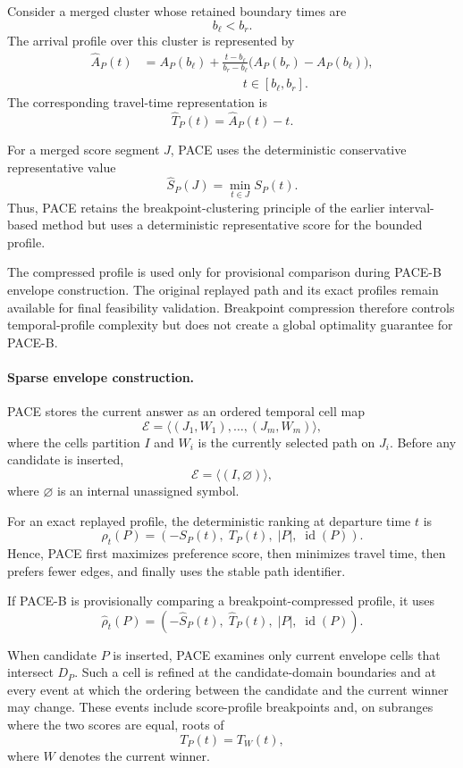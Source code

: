 \documentclass[a4paper,fleqn]{cas-dc}
\begin{document}
Consider a merged cluster whose retained boundary times are
\[
b_\ell<b_r.
\]
The arrival profile over this cluster is represented by
\[
\begin{aligned}
\widehat A_P(t)
&=A_P(b_\ell)
+\frac{t-b_\ell}{b_r-b_\ell}
\bigl(A_P(b_r)-A_P(b_\ell)\bigr),\\[-0.2ex]
&\hspace{8em} t\in[b_\ell,b_r].
\end{aligned}
\]
The corresponding travel-time representation is
\[
\widehat T_P(t)
=
\widehat A_P(t)-t.
\]

For a merged score segment \(J\), PACE uses the deterministic conservative
representative value
\[
\widehat S_P(J)
=
\min_{t\in J}S_P(t).
\]
Thus, PACE retains the breakpoint-clustering principle of the earlier
interval-based method but uses a deterministic representative score for the
bounded profile.

The compressed profile is used only for provisional comparison during
PACE-B envelope construction. The original replayed path and its exact
profiles remain available for final feasibility validation. Breakpoint
compression therefore controls temporal-profile complexity but does not create
a global optimality guarantee for PACE-B.

\paragraph{Sparse envelope construction.}
PACE stores the current answer as an ordered temporal cell map
\[
\mathcal E
=
\langle
(J_1,W_1),\ldots,(J_m,W_m)
\rangle,
\]
where the cells partition \(I\) and \(W_i\) is the currently selected path on
\(J_i\). Before any candidate is inserted,
\[
\mathcal E
=
\langle
(I,\varnothing)
\rangle,
\]
where \(\varnothing\) is an internal unassigned symbol.

For an exact replayed profile, the deterministic ranking at departure time
\(t\) is
\[
\rho_t(P)
=
\left(
-S_P(t),\;
T_P(t),\;
|P|,\;
\operatorname{id}(P)
\right).
\]
Hence, PACE first maximizes preference score, then minimizes travel time, then
prefers fewer edges, and finally uses the stable path identifier.

If PACE-B is provisionally comparing a breakpoint-compressed profile, it uses
\[
\widehat\rho_t(P)
=
\left(
-\widehat S_P(t),\;
\widehat T_P(t),\;
|P|,\;
\operatorname{id}(P)
\right).
\]

When candidate \(P\) is inserted, PACE examines only current envelope cells
that intersect \(D_P\). Such a cell is refined at the candidate-domain
boundaries and at every event at which the ordering between the candidate and
the current winner may change. These events include score-profile breakpoints
and, on subranges where the two scores are equal, roots of
\[
T_P(t)=T_W(t),
\]
where \(W\) denotes the current winner.
\end{document}
